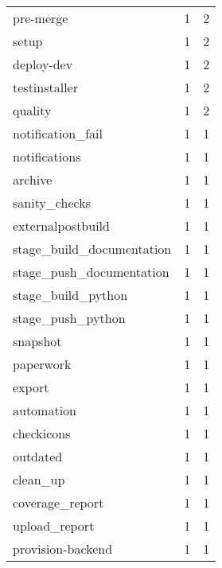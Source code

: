 \begin{tabular}{lrr}
pre-merge                  &                   1 &             2 \\
setup                      &                   1 &             2 \\
deploy-dev                 &                   1 &             2 \\
testinstaller              &                   1 &             2 \\
quality                    &                   1 &             2 \\
notification\_fail          &                   1 &             1 \\
notifications              &                   1 &             1 \\
archive                    &                   1 &             1 \\
sanity\_checks              &                   1 &             1 \\
externalpostbuild          &                   1 &             1 \\
stage\_build\_documentation  &                   1 &             1 \\
stage\_push\_documentation   &                   1 &             1 \\
stage\_build\_python         &                   1 &             1 \\
stage\_push\_python          &                   1 &             1 \\
snapshot                   &                   1 &             1 \\
paperwork                  &                   1 &             1 \\
export                     &                   1 &             1 \\
automation                 &                   1 &             1 \\
checkicons                 &                   1 &             1 \\
outdated                   &                   1 &             1 \\
clean\_up                   &                   1 &             1 \\
coverage\_report            &                   1 &             1 \\
upload\_report              &                   1 &             1 \\
provision-backend          &                   1 &             1 \\

\end{tabular}

